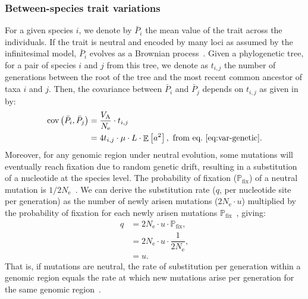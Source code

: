\documentclass{article}
\newcommand{\Multiply}{\cdot}
\DeclareMathOperator{\E}{\mathbb{E}}
\DeclareMathOperator{\Cov}{\text{cov}}
\newcommand{\Ne}{N_{\text{e}}}
\newcommand{\proba}{\mathbb{P}}
\newcommand{\pfix}{\proba_{\text{fix}}}
\newcommand{\Spi}{i}
\newcommand{\Spj}{j}
\newcommand{\NbrGen}{t_{\Spi, \Spj}}
\newcommand{\Trait}{P}
\newcommand{\MeanTrait}{\bar{\Trait}}
\newcommand{\VarPhy}{\Cov \left( \MeanTrait_{\Spi}, \MeanTrait_{\Spj}\right)}
\newcommand{\MutationRatePheno}{\mu}
\newcommand{\MutationRateNuc}{u}
\newcommand{\SubRate}{q}
\newcommand{\NbrLoci}{L}
\newcommand{\VarGenetic}{V_{\mathrm{A}}}
\newcommand{\GenArchi}{\NbrLoci \Multiply \E \left[ a^2 \right]}
\begin{document}
\subsubsection*{Between-species trait variations}\label{subsec:between-species-var}
For a given species $\Spi$, we denote by $\MeanTrait_{\Spi}$ the mean value of the trait across the individuals.
If the trait is neutral and encoded by many loci as assumed by the infinitesimal model, $\MeanTrait_{\Spi}$ evolves as a Brownian process~\citep{felsenstein_phylogenies_1985, hansen_translating_1996}.
Given a phylogenetic tree, for a pair of species $\Spi$ and $\Spj$ from this tree, we denote as $\NbrGen$ the number of generations between the root of the tree and the most recent common ancestor of taxa $\Spi$ and $\Spj$.
Then, the covariance between $\MeanTrait_{\Spi}$ and $\MeanTrait_{\Spj}$ depends on $\NbrGen$ as given in \citet{hansen_translating_1996} by:
\begin{align}
    \VarPhy & = \frac{\VarGenetic}{\Ne} \Multiply \NbrGen \\
    & = 4 \NbrGen \Multiply \MutationRatePheno \Multiply \GenArchi \label{eq:covar},\text{ from eq.~\ref{eq:var-genetic}}.
\end{align}
Moreover, for any genomic region under neutral evolution, some mutations will eventually reach fixation due to random genetic drift, resulting in a substitution of a nucleotide at the species level.
The probability of fixation ($\pfix$) of a neutral mutation is $1/2\Ne$~\citep{kimura_probability_1962}.
We can derive the substitution rate ($\SubRate$, per nucleotide site per generation) as the number of newly arisen mutations ($2\Ne \Multiply \MutationRateNuc$) multiplied by the probability of fixation for each newly arisen mutations $\pfix$~\citep{kimura_evolutionary_1968}, giving:
\begin{align}
    \SubRate & = 2 \Ne \Multiply \MutationRateNuc \Multiply \pfix, \\
    & = 2 \Ne  \Multiply \MutationRateNuc  \Multiply \dfrac{1}{2\Ne}, \\
    & = \MutationRateNuc. \label{eq:substitution-rate}
\end{align}
That is, if mutations are neutral, the rate of substitution per generation within a genomic region equals the rate at which new mutations arise per generation for the same genomic region~\citep[review]{mccandlish_modeling_2014}.
\end{document}
